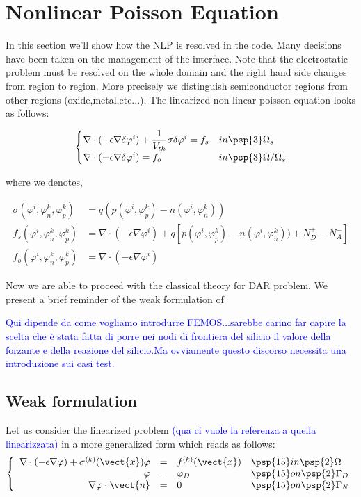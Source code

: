 \section{Nonlinear Poisson Equation}
In this section we'll show how the NLP is resolved in the code. Many decisions have been taken on the management of the interface. Note that the electrostatic problem must be resolved on the whole domain and the right hand side changes from region to region. More precisely we distinguish semiconductor regions from other regions (oxide,metal,etc...). The linearized non linear poisson equation looks as follows:


\begin{equation}
\begin{cases}

\nabla \cdot (-\epsilon \nabla \delta\varphi^{i}) 
+   \dfrac{1}{V_{th}} \sigma\delta\varphi^{i} 
 =  f_s & in \psp{3} \Omega_s
  \\
\nabla \cdot (-\epsilon \nabla \delta\varphi^i) =  f_o & in \psp{3} \Omega / \Omega_s
\end{cases} 
\end{equation}

where we denotes,

\begin{align*}
\sigma(\varphi^{i},\varphi_n^{k},\varphi_p^{k}) & =q(p(\varphi^{i},\varphi_p^{k})-n(\varphi^{i},\varphi_n^{k}))
\\
f_s(\varphi^{i},\varphi_n^{k},\varphi_p^{k}) & = \nabla \cdot (-\epsilon \nabla \varphi^{i}) + q\left[ p(\varphi^{i},\varphi_p^{k})-n(\varphi^{i},\varphi_n^{k})) + N_D^+-N_A^- \right]
\\
f_o(\varphi^{i},\varphi_n^{k},\varphi_p^{k}) & = \nabla \cdot (-\epsilon \nabla \varphi^{i}) 
\end{align*}


Now we are able to proceed with the classical theory for DAR problem. We present a brief reminder of the weak formulation of  


\textcolor{blue}{Qui dipende da come vogliamo introdurre FEMOS...sarebbe carino far capire la scelta che è stata fatta di porre nei nodi di frontiera del silicio il valore della forzante e della reazione del silicio.Ma ovviamente questo discorso necessita una introduzione sui casi test.}

\subsection{Weak formulation}
Let us consider the linearized problem \textcolor{blue}{(qua ci vuole la referenza a quella linearizzata)} in a more generalized form which reads as follows:
\begin{equation}
\left\{
\begin{array}{rcll}
\nabla \cdot (-\epsilon \nabla \varphi) + \sigma^{(k)}(\vect{x}) \varphi & = &  f^{(k)}(\vect{x}) & \psp{15} in \psp{2} \Omega \\
\varphi & = & \varphi_D & \psp{15} on \psp{2} \Gamma_D \\
\nabla \varphi \cdot \vect{n} & = & 0 & \psp{15} on \psp{2} \Gamma_N
\end{array}
\right.
\end{equation}

